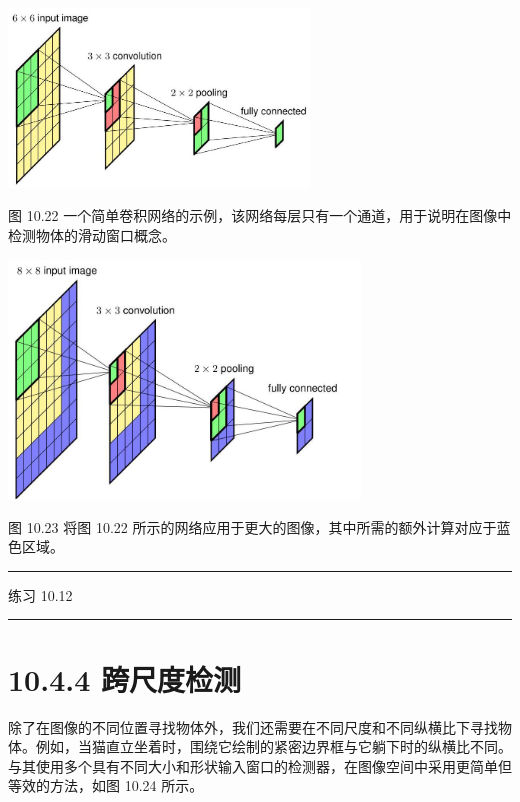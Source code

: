 \documentclass[10pt]{report}
\newcommand{\HRule}{\begin{center}\rule{0.9\linewidth}{0.2mm}\end{center}}
\begin{document}
\begin{center}
\includegraphics[max width=0.6\textwidth]{images/0194e279-9b28-703a-88f4-c3ac21e2010d_331_710_1517_836_497_0.jpg}
\end{center}
\hspace*{3em} 

图 10.22 一个简单卷积网络的示例，该网络每层只有一个通道，用于说明在图像中检测物体的滑动窗口概念。

\begin{center}
\includegraphics[max width=0.7\textwidth]{images/0194e279-9b28-703a-88f4-c3ac21e2010d_332_592_351_925_628_0.jpg}
\end{center}
\hspace*{3em} 

图 10.23 将图 10.22 所示的网络应用于更大的图像，其中所需的额外计算对应于蓝色区域。

\HRule

练习 10.12

\HRule

\section*{10.4.4 跨尺度检测}

除了在图像的不同位置寻找物体外，我们还需要在不同尺度和不同纵横比下寻找物体。例如，当猫直立坐着时，围绕它绘制的紧密边界框与它躺下时的纵横比不同。与其使用多个具有不同大小和形状输入窗口的检测器，在图像空间中采用更简单但等效的方法，如图 10.24 所示。
\end{document}
